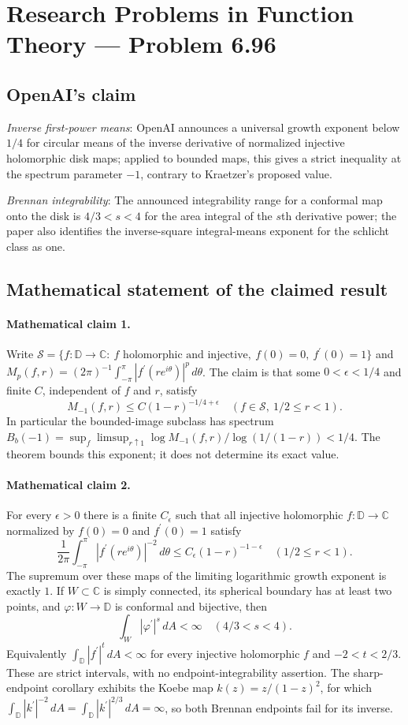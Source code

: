 \documentclass[11pt]{article}
\begin{document}
\section*{Research Problems in Function Theory — Problem 6.96}

\subsection{OpenAI's claim}
\textit{Inverse first-power means}: OpenAI announces a universal growth exponent below $1/4$ for circular means of the inverse derivative of normalized injective holomorphic disk maps; applied to bounded maps, this gives a strict inequality at the spectrum parameter $-1$, contrary to Kraetzer’s proposed value.

\textit{Brennan integrability}: The announced integrability range for a conformal map onto the disk is $4/3<s<4$ for the area integral of the $s$th derivative power; the paper also identifies the inverse-square integral-means exponent for the schlicht class as one.

\subsection{Mathematical statement of the claimed result}
\paragraph{Mathematical claim 1.} Write $\mathcal S=\{f:\mathbb D\to\mathbb C:\ f\text{ holomorphic and injective},\ f(0)=0,\ f^\prime(0)=1\}$ and $M_p(f,r)=(2\pi)^{-1}\int_{-\pi}^{\pi}|f^\prime(re^{i\theta})|^p\,d\theta$. The claim is that some $0<\epsilon<1/4$ and finite $C$, independent of $f$ and $r$, satisfy \[M_{-1}(f,r)\le C(1-r)^{-1/4+\epsilon}\quad(f\in\mathcal S,\ 1/2\le r<1).\] In particular the bounded-image subclass has spectrum $B_b(-1)=\sup_f\limsup_{r\uparrow1}\log M_{-1}(f,r)/\log(1/(1-r))<1/4$. The theorem bounds this exponent; it does not determine its exact value.

\paragraph{Mathematical claim 2.} For every $\epsilon>0$ there is a finite $C_\epsilon$ such that all injective holomorphic $f:\mathbb D\to\mathbb C$ normalized by $f(0)=0$ and $f^\prime(0)=1$ satisfy \[\frac1{2\pi}\int_{-\pi}^{\pi}|f^\prime(re^{i\theta})|^{-2}\,d\theta\le C_\epsilon(1-r)^{-1-\epsilon}\quad(1/2\le r<1).\] The supremum over these maps of the limiting logarithmic growth exponent is exactly $1$. If $W\subset\mathbb C$ is simply connected, its spherical boundary has at least two points, and $\varphi:W\to\mathbb D$ is conformal and bijective, then \[\int_W|\varphi^\prime|^s\,dA<\infty\quad(4/3<s<4).\] Equivalently $\int_{\mathbb D}|f^\prime|^t\,dA<\infty$ for every injective holomorphic $f$ and $-2<t<2/3$. These are strict intervals, with no endpoint-integrability assertion. The sharp-endpoint corollary exhibits the Koebe map $k(z)=z/(1-z)^2$, for which $\int_{\mathbb D}|k^\prime|^{-2}\,dA=\int_{\mathbb D}|k^\prime|^{2/3}\,dA=\infty$, so both Brennan endpoints fail for its inverse.
\end{document}
